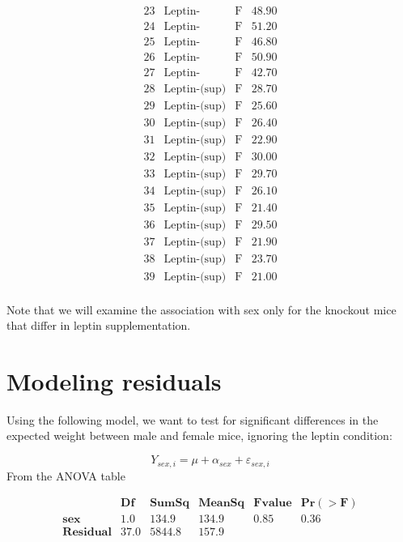 \documentclass[
]{book}
\begin{document}
\[\begin{array}{cccc}
23&\text{Leptin-}&\text{F}&  48.90 \\
24&\text{Leptin-}&\text{F}&  51.20 \\
25&\text{Leptin-}&\text{F}&  46.80 \\
26&\text{Leptin-}&\text{F}&  50.90 \\
27&\text{Leptin-}&\text{F}&  42.70 \\
28& \text{Leptin-(sup)}&\text{F}&  28.70 \\
29& \text{Leptin-(sup)}&\text{F}&  25.60 \\
30& \text{Leptin-(sup)}&\text{F}&  26.40 \\
31& \text{Leptin-(sup)}&\text{F}&  22.90 \\
32& \text{Leptin-(sup)}&\text{F}&  30.00 \\
33& \text{Leptin-(sup)}&\text{F}&  29.70 \\
34& \text{Leptin-(sup)}&\text{F}&  26.10 \\
35& \text{Leptin-(sup)}&\text{F}&  21.40 \\
36& \text{Leptin-(sup)}&\text{F}&  29.50 \\
37 &\text{Leptin-(sup)}&\text{F}&  21.90 \\
38 &\text{Leptin-(sup)}&\text{F}&  23.70 \\
39 &\text{Leptin-(sup)}&\text{F}&  21.00 \\
\end{array}
\]

Note that we will examine the association with sex only for the knockout mice that differ in leptin supplementation.

\hypertarget{modeling-residuals}{%
\section{Modeling residuals}\label{modeling-residuals}}

Using the following model, we want to test for significant differences in the expected weight between male and female mice, ignoring the leptin condition:

\[Y_{sex,i}= \mu + \alpha_{sex} + \varepsilon_{sex,i}\]
From the ANOVA table

\[
\begin{array}{cccccc}
&\mathbf{Df} & \mathbf{Sum Sq} & \mathbf{Mean Sq} & \mathbf{F value} & \mathbf{Pr(>F)} \\ 
\mathbf{sex}       & 1.0 &  134.9 & 134.9&  0.85  & 0.36 \\
\mathbf{Residual}  & 37.0  & 5844.8 & 157.9  &     &      \end{array}
\]
\end{document}
